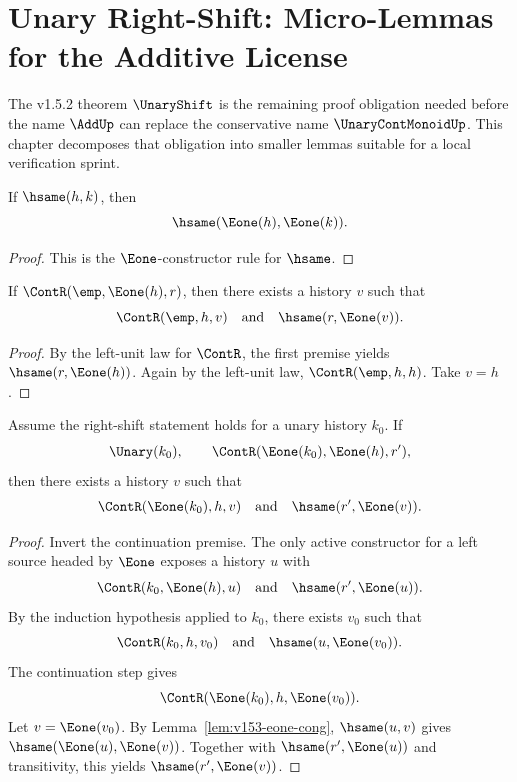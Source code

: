 \chapter{Unary Right-Shift: Micro-Lemmas for the Additive License}
\label{ch:v153-unary-shift-micro-lemmas}

The v1.5.2 theorem \(\UnaryShift\) is the remaining proof obligation needed before the name \(\AddUp\) can replace the conservative name \(\UnaryContMonoidUp\). This chapter decomposes that obligation into smaller lemmas suitable for a local verification sprint.

\begin{lemma}
\label{lem:v153-eone-cong}
If \(\hsame(h,k)\), then
\[
  \hsame(\Eone(h),\Eone(k)).
\]
\end{lemma}

\begin{proof}
This is the \(\Eone\)-constructor rule for \(\hsame\).
\end{proof}

\begin{lemma}
\label{lem:v153-unary-shift-base}
If \(\ContR(\emp,\Eone(h),r)\), then there exists a history \(v\) such that
\[
  \ContR(\emp,h,v)
  \quad\text{and}\quad
  \hsame(r,\Eone(v)).
\]
\end{lemma}

\begin{proof}
By the left-unit law for \(\ContR\), the first premise yields \(\hsame(r,\Eone(h))\). Again by the left-unit law, \(\ContR(\emp,h,h)\). Take \(v=h\).
\end{proof}

\begin{lemma}
\label{lem:v153-unary-shift-step}
Assume the right-shift statement holds for a unary history \(k_0\). If
\[
  \Unary(k_0),
  \qquad
  \ContR(\Eone(k_0),\Eone(h),r'),
\]
then there exists a history \(v\) such that
\[
  \ContR(\Eone(k_0),h,v)
  \quad\text{and}\quad
  \hsame(r',\Eone(v)).
\]
\end{lemma}

\begin{proof}
Invert the continuation premise. The only active constructor for a left source headed by \(\Eone\) exposes a history \(u\) with
\[
  \ContR(k_0,\Eone(h),u)
  \quad\text{and}\quad
  \hsame(r',\Eone(u)).
\]
By the induction hypothesis applied to \(k_0\), there exists \(v_0\) such that
\[
  \ContR(k_0,h,v_0)
  \quad\text{and}\quad
  \hsame(u,\Eone(v_0)).
\]
The continuation step gives
\[
  \ContR(\Eone(k_0),h,\Eone(v_0)).
\]
Let \(v=\Eone(v_0)\). By Lemma~\ref{lem:v153-eone-cong}, \(\hsame(u,v)\) gives \(\hsame(\Eone(u),\Eone(v))\). Together with \(\hsame(r',\Eone(u))\) and transitivity, this yields \(\hsame(r',\Eone(v))\).
\end{proof}

